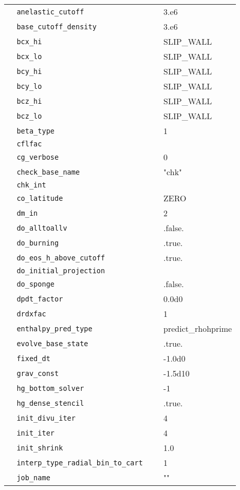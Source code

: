 \begin{center}
\begin{longtable}{|l|p{3.0in}|l|}
\verb=  anelastic_cutoff =  &   &  3.e6 \\
\verb=  base_cutoff_density =  &   &  3.e6 \\
\verb=  bcx_hi =  &   &  SLIP\_WALL \\
\verb=  bcx_lo =  &   &  SLIP\_WALL \\
\verb=  bcy_hi =  &   &  SLIP\_WALL \\
\verb=  bcy_lo =  &   &  SLIP\_WALL \\
\verb=  bcz_hi =  &   &  SLIP\_WALL \\
\verb=  bcz_lo =  &   &  SLIP\_WALL \\
\verb=  beta_type =  &   &  1 \\
\verb=  cflfac =  &   &  \\
\verb=  cg_verbose =  &   &  0 \\
\verb=  check_base_name =  &   &  "chk" \\
\verb=  chk_int =  &   &  \\
\verb=  co_latitude =  &   &  ZERO \\
\verb=  dm_in =  &   &  2 \\
\verb=  do_alltoallv =  &   &  .false. \\
\verb=  do_burning =  &   &  .true. \\
\verb=  do_eos_h_above_cutoff =  &   &  .true. \\
\verb=  do_initial_projection =  &   &  \\
\verb=  do_sponge =  &   &  .false. \\
\verb=  dpdt_factor =  &   &  0.0d0 \\
\verb=  drdxfac =  &   &  1 \\
\verb=  enthalpy_pred_type =  &   &  predict\_rhohprime \\
\verb=  evolve_base_state =  &   &  .true. \\
\verb=  fixed_dt =  &   &  -1.0d0 \\
\verb=  grav_const =  &   &  -1.5d10 \\
\verb=  hg_bottom_solver =  &   &  -1 \\
\verb=  hg_dense_stencil =  &   &  .true. \\
\verb=  init_divu_iter =  &   &  4 \\
\verb=  init_iter =  &   &  4 \\
\verb=  init_shrink =  &   &  1.0 \\
\verb=  interp_type_radial_bin_to_cart =  &   &  1 \\
\verb=  job_name =  &   &  "" \\

\end{longtable}
\end{center}
